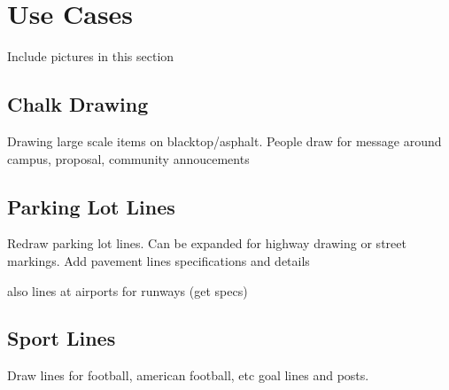 
\section{Use Cases}
\label{sec:use_cases}
Include pictures in this section

\subsection{Chalk Drawing}
Drawing large scale items on blacktop/asphalt. People draw for message around campus, proposal, community annoucements

\subsection{Parking Lot Lines}
Redraw parking lot lines. Can be expanded for highway drawing or street markings. Add pavement lines specifications and details

also lines at airports for runways (get specs)

\subsection{Sport Lines}
Draw lines for football, american football, etc goal lines and posts. 
